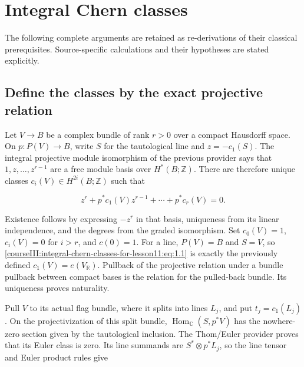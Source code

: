 \section{Integral Chern classes}\label{courseIII:integral-chern-classes-for-lesson11:section}

The following complete arguments are retained as re-derivations of their classical prerequisites. Source-specific calculations and their hypotheses are stated explicitly.

\subsection{Define the classes by the exact projective relation}
\label{courseIII:integral-chern-classes-for-lesson11:integral-definition}

\label{courseIII:integral-chern-classes-for-lesson11:section-1}\label{courseIII:integral-chern-classes-for-lesson11:CG-S6-CHERN-1}

Let \(V\to B\) be a complex bundle of rank \(r>0\) over a compact Hausdorff space. On \(p:P(V)\to B\), write \(S\) for the tautological line and \(z=-c_1(S)\). The integral projective module isomorphism of the previous provider says that \(1,z,\ldots,z^{r-1}\) are a free module basis over \(H^*(B;\mathbb Z)\). There are therefore unique classes \(c_i(V)\in H^{2i}(B;\mathbb Z)\) such that

\begin{equation}
z^r+p^*c_1(V)z^{r-1}+\cdots+p^*c_r(V)=0.
\label{courseIII:integral-chern-classes-for-lesson11:eq:1.1}
\end{equation}

Existence follows by expressing \(-z^r\) in that basis, uniqueness from its linear independence, and the degrees from the graded isomorphism. Set \(c_0(V)=1\), \(c_i(V)=0\) for \(i>r\), and \(c(0)=1\). For a line, \(P(V)=B\) and \(S=V\), so \eqref{courseIII:integral-chern-classes-for-lesson11:eq:1.1} is exactly the previously defined \(c_1(V)=e(V_{\mathbb R})\). Pullback of the projective relation under a bundle pullback between compact bases is the relation for the pulled-back bundle. Its uniqueness proves naturality.

Pull \(V\) to its actual flag bundle, where it splits into lines \(L_j\), and put \(t_j=c_1(L_j)\). On the projectivization of this split bundle, \(\operatorname{Hom}_{\mathbb C}(S,p^*V)\) has the nowhere-zero section given by the tautological inclusion. The Thom/Euler provider proves that its Euler class is zero. Its line summands are \(S^*\otimes p^*L_j\), so the line tensor and Euler product rules give

